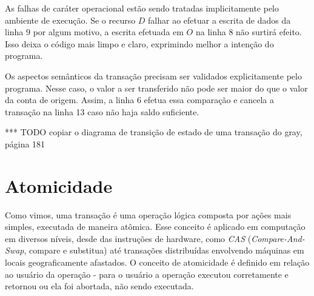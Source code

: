 \documentclass[11pt,twoside,a4paper]{book}
\begin{document}
As falhas de caráter operacional estão sendo tratadas implicitamente pelo ambiente de execução. Se o recurso $D$ falhar ao efetuar a escrita de dados da linha 9 por algum motivo, a escrita efetuada em $O$ na linha 8 não surtirá efeito. Isso deixa o código mais limpo e claro, exprimindo melhor a intenção do programa.

Os aspectos semânticos da transação precisam ser validados explicitamente pelo programa. Nesse caso, o valor a ser transferido não pode ser maior do que o valor da conta de origem. Assim, a linha 6 efetua essa comparação e cancela a transação na linha 13 caso não haja saldo suficiente.




*** TODO copiar o diagrama de transição de estado de uma transação do gray, página 181

\section{Atomicidade}
\label{sec:atomicidade}
Como vimos, uma transação é uma operação lógica composta por ações mais simples, executada de maneira atômica. Esse conceito é aplicado em computação em diversos níveis, desde das instruções de hardware, como \emph{CAS} (\emph{Compare-And-Swap}, compare e substitua) até transações distribuídas envolvendo máquinas em locais geograficamente afastados. O conceito de atomicidade é definido em relação ao usuário da operação - para o usuário a operação executou corretamente e retornou ou ela foi abortada, não sendo executada.
\end{document}
